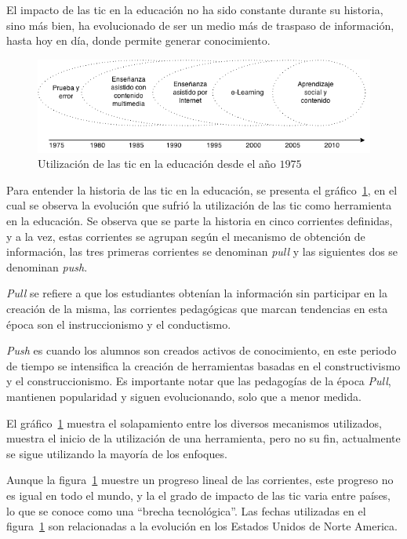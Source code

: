 El impacto de las \Gls{tic} en la educación no ha sido constante durante su
historia, sino más bien, ha evolucionado de ser un medio más de traspaso de
información, hasta hoy en día, donde permite generar
conocimiento\cite{tinio:ict}.

\begin{figure}
\centering
\includegraphics[scale=0.75]{tics/images/tics_history.png}
\caption{Utilización de las \Gls{tic} en la educación desde el año $1975$}
\label{fig:history_tics}
\end{figure}

Para entender la historia de las \Gls{tic} en la educación, se presenta el
gráfico~\ref{fig:history_tics}, en el cual se observa la evolución que sufrió la
utilización de las \Gls{tic} como herramienta en la educación. Se observa que se
parte la historia en cinco corrientes definidas, y a la vez, estas corrientes se
agrupan según el mecanismo de obtención de información, las tres primeras
corrientes se denominan \textit{pull} y las siguientes dos se denominan
\textit{push}. 

\textit{Pull} se refiere a que los estudiantes obtenían la
información sin participar en la creación de la misma, las corrientes
pedagógicas que marcan tendencias en esta época son el instruccionismo y el
conductismo\cite{white:ict}.

\textit{Push} es cuando los alumnos son creados activos de
conocimiento\cite{white:ict,leinonen:ict}, en este periodo de tiempo se
intensifica la creación de herramientas basadas en el constructivismo y el
construccionismo. Es importante notar que las pedagogías de la época
\textit{Pull}, mantienen popularidad y siguen evolucionando, solo que a menor
medida\cite{white:ict}.

El gráfico~\ref{fig:history_tics} muestra el solapamiento entre los diversos
mecanismos utilizados, muestra el inicio de la utilización de una herramienta,
pero no su fin, actualmente se sigue utilizando la mayoría de los
enfoques\cite{leinonen:ict}.

Aunque la figura~\ref{fig:history_tics} muestre un progreso lineal de las
corrientes, este progreso no es igual en todo el mundo, y la el grado de
impacto de las \Gls{tic} varia entre países, lo que se conoce como una
\enquote{brecha tecnológica}. Las fechas utilizadas en el
figura~\ref{fig:history_tics} son relacionadas a la evolución en los Estados
Unidos de Norte America.


